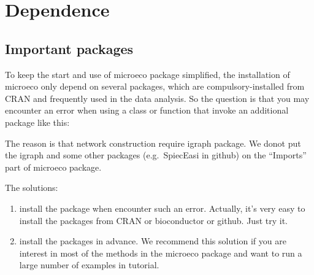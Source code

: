 \documentclass[
]{book}
\newenvironment{Shaded}{\begin{snugshade}}{\end{snugshade}}
\newcommand{\AttributeTok}[1]{\textcolor[rgb]{0.77,0.63,0.00}{#1}}
\newcommand{\ConstantTok}[1]{\textcolor[rgb]{0.00,0.00,0.00}{#1}}
\newcommand{\FloatTok}[1]{\textcolor[rgb]{0.00,0.00,0.81}{#1}}
\newcommand{\FunctionTok}[1]{\textcolor[rgb]{0.00,0.00,0.00}{#1}}
\newcommand{\NormalTok}[1]{#1}
\newcommand{\OtherTok}[1]{\textcolor[rgb]{0.56,0.35,0.01}{#1}}
\newcommand{\SpecialCharTok}[1]{\textcolor[rgb]{0.00,0.00,0.00}{#1}}
\newcommand{\StringTok}[1]{\textcolor[rgb]{0.31,0.60,0.02}{#1}}
\begin{document}
\hypertarget{dependence}{%
\section{Dependence}\label{dependence}}

\hypertarget{important-packages}{%
\subsection{Important packages}\label{important-packages}}

To keep the start and use of microeco package simplified,
the installation of microeco only depend on several packages, which are compulsory-installed from CRAN and frequently used in the data analysis.
So the question is that you may encounter an error when using a class or function that invoke an additional package like this:

\begin{Shaded}
\end{Shaded}

\begin{Shaded}
\end{Shaded}

The reason is that network construction require igraph package. We donot put the igraph and some other packages (e.g.~SpiecEasi in github) on the ``Imports'' part of microeco package.

The solutions:

\begin{enumerate}
\def\labelenumi{\arabic{enumi}.}
\item
  install the package when encounter such an error. Actually, it's very easy to install the packages from CRAN or bioconductor or github. Just try it.
\item
  install the packages in advance. We recommend this solution if you are interest in most of the methods in the microeco package and want to run a large number of examples in tutorial.
\end{enumerate}
\end{document}
